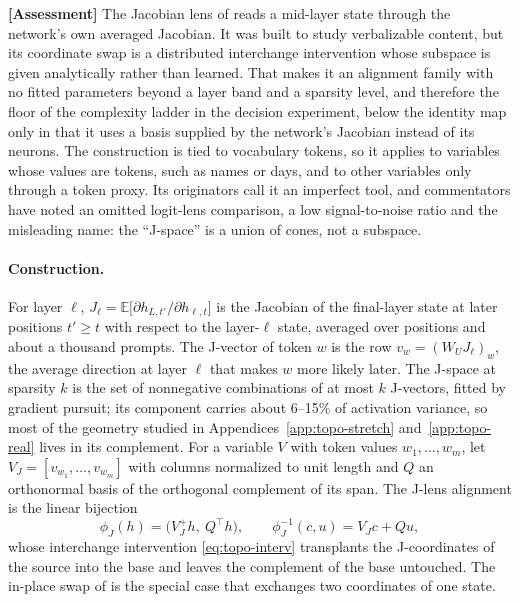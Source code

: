 \documentclass[11pt,a4paper]{article}
\newcommand{\E}{\mathbb E}
\newcommand{\evl}[2]{{\small\bfseries\color{#1}[#2]}}
\newcommand{\LAssess}{\evl{cassess}{Assessment}}
\begin{document}
\LAssess{} The Jacobian lens of \cite{gurnee2026workspace} reads a
mid-layer state through the network's own averaged Jacobian. It was built to
study verbalizable content, but its coordinate swap is a distributed
interchange intervention whose subspace is given analytically rather than
learned. That makes it an alignment family with no fitted parameters beyond
a layer band and a sparsity level, and therefore the floor of the complexity
ladder in the decision experiment, below the identity map only in that it
uses a basis supplied by the network's Jacobian instead of its neurons. The
construction is tied to vocabulary tokens, so it applies to variables whose
values are tokens, such as names or days, and to other variables only
through a token proxy. Its originators call it an imperfect tool, and
commentators have noted an omitted logit-lens comparison, a low
signal-to-noise ratio and the misleading name: the ``J-space'' is a union
of cones, not a subspace.

\paragraph{Construction.} For layer $\ell$, $J_\ell=\E\bigl[\partial
h_{L,t'}/\partial h_{\ell,t}\bigr]$ is the Jacobian of the final-layer
state at later positions $t'\ge t$ with respect to the layer-$\ell$ state,
averaged over positions and about a thousand prompts. The J-vector of token
$w$ is the row $v_w=(W_UJ_\ell)_w$, the average direction at layer $\ell$
that makes $w$ more likely later. The J-space at sparsity $k$ is the set of
nonnegative combinations of at most $k$ J-vectors, fitted by gradient
pursuit; its component carries about 6--15\% of activation variance, so most
of the geometry studied in Appendices~\ref{app:topo-stretch}
and~\ref{app:topo-real} lives in its complement. For a variable $V$ with
token values $w_1,\dots,w_m$, let $V_J=[v_{w_1},\dots,v_{w_m}]$ with columns
normalized to unit length and $Q$ an orthonormal basis of the orthogonal
complement of its span. The J-lens alignment is the linear bijection
\begin{equation}
\phi_J(h)=\bigl(V_J^{+}h,\ Q^{\!\top}h\bigr),\qquad
\phi_J^{-1}(c,u)=V_Jc+Qu,
\label{eq:topo-jlens}
\end{equation}
whose interchange intervention \eqref{eq:topo-interv} transplants the
J-coordinates of the source into the base and leaves the complement of the
base untouched. The in-place swap of \cite{gurnee2026workspace} is the
special case that exchanges two coordinates of one state.
\end{document}
